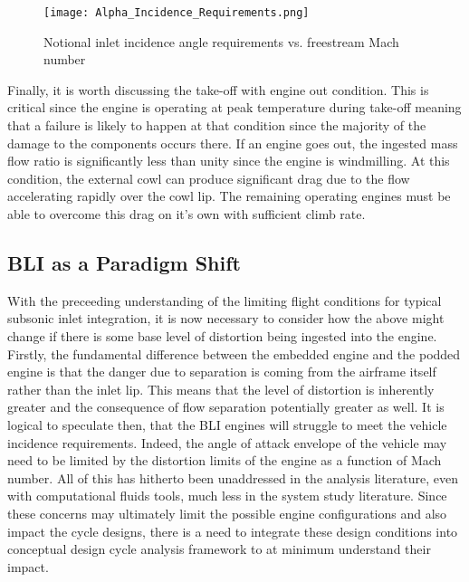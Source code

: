 	\begin{figure}[htpb]
	\centering
	\texttt{[image: Alpha\_Incidence\_Requirements.png]}
	\caption{Notional inlet incidence angle requirements vs. freestream Mach number \cite{Oates1989}}
	\label{Alpha_Incidence_Requirements}
	\end{figure}

Finally, it is worth discussing the take-off with engine out condition.  This is critical since the engine is operating at peak temperature during take-off meaning that a failure is likely to happen at that condition since the majority of the damage to the components occurs there.  If an engine goes out, the ingested mass flow ratio is significantly less than unity since the engine is windmilling.  At this condition, the external cowl can produce significant drag due to the flow accelerating rapidly over the cowl lip.  The remaining operating engines must be able to overcome this drag on it's own with sufficient climb rate.  

\subsection{BLI as a Paradigm Shift}
\indent With the preceeding understanding of the limiting flight conditions for typical subsonic inlet integration, it is now necessary to consider how the above might change if there is some base level of distortion being ingested into the engine.  Firstly, the fundamental difference between the embedded engine and the podded engine is that the danger due to separation is coming from the airframe itself rather than the inlet lip.  This means that the level of distortion is inherently greater and the consequence of flow separation potentially greater as well.  It is logical to speculate then, that the BLI engines will struggle to meet the vehicle incidence requirements.  Indeed, the angle of attack envelope of the vehicle may need to be limited by the distortion limits of the engine as a function of Mach number.  All of this has hitherto been unaddressed in the analysis literature, even with computational fluids tools, much less in the system study literature.  Since these concerns may ultimately limit the possible engine configurations and also impact the cycle designs, there is a need to integrate these design conditions into conceptual design cycle analysis framework to at minimum understand their impact.  


